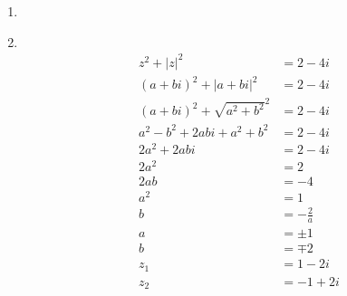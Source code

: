 \documentclass[fleqn]{article}
\newenvironment{answers}{ %
	\begin{enumerate}
		\setlength{\itemsep}{\bigskipamount}
}{\end{enumerate}}
\newcommand\Item[1][]{ %
  \ifx\relax#1\relax  \item \else \item[#1] \fi
  \abovedisplayskip=0pt\abovedisplayshortskip=0pt~\vspace*{-\baselineskip}}
\begin{document}
\begin{answers}
\begin{enumerate}
			\Item[(d)]
				\begin{align*}
					z^2 + |z|^2                  & = 2 - 4i \\
					(a+bi)^2 + |a+bi|^2          & = 2 - 4i \\
					(a+bi)^2 + \sqrt{a^2+b^2}^2  & = 2 - 4i \\
					a^2 - b^2 + 2abi + a^2 + b^2 & = 2 - 4i \\
					2a^2 + 2abi                  & = 2 - 4i \\
					2a^2                         & = 2 \\
					2ab                          & = -4 \\
					a^2                          & = 1 \\
					b                            & = - \frac{2}{a} \\
					a                            & = \pm 1 \\
					b                            & = \mp 2 \\
					z_1                          & = 1 - 2i \\
					z_2                          & = -1 + 2i
				\end{align*}
		\end{enumerate}

\end{answers}
\end{document}
